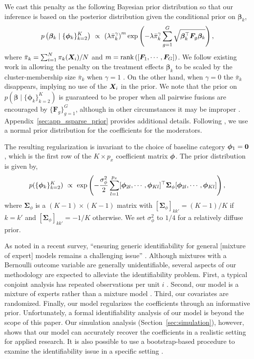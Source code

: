 We cast this penalty as the following Bayesian prior distribution so
that our inference is based on the posterior distribution given the conditional prior on $\bm{\beta}_k$,
\begin{equation}
\label{eq:prior_beta}
p\left(\bbeta_k \mid \{\bm{\phi}_k\}_{k=2}^K\right) \ \propto \ \left(\lambda {\bar{\pi}_k^\gamma}\right)^m \exp\left(-\lambda \bar{\pi}_k^\gamma \sum_{g=1}^{G} \sqrt{\bbeta_k^\top\bF_{g} \bbeta_k}\right), 
\end{equation}
where $\bar{\pi}_k = \sum_{i=1}^N \pi_k(\bm{X}_i)/N$ and
$m = \text{rank}\left([\bm{F}_{1}, \cdots, \bm{F}_{G}]\right)$. We follow
existing work in allowing the penalty on the treatment effects
$\bm{\beta}_k$ to be scaled by the cluster-membership size
$\bar{\pi}_k$ when $\gamma = 1$
\citep{khal:chen:07,stadler2010lasso}.
On the other hand, when $\gamma = 0$ the $\bar{\pi}_k$ disappears, implying no use of the $\bm{X}_i$ in the prior.
 We note that the prior on
$p(\bm{\beta} \mid \{\bm{\phi}_k\}_{k=2}^K)$ is guaranteed to be
proper when all pairwise fusions are encouraged by
$\{\bm{F}_g\}_{g=1}^G$, although in other circumstances it may be
improper
\citep{goplerud2021sparsity}.  Appendix~\ref{sec:app_ssparse_prior}
provides additional details. Following \cite{zahid2013ridge}, we use a
normal prior distribution for the coefficients for the moderators.

The resulting regularization is invariant to the choice of baseline
category $\bm{\phi}_1 = \bm{0}$, which is the first row of the
$K \times p_x$ coefficient matrix $\bm{\phi}$.  The prior distribution is
given by,
\begin{equation}
\label{eq:prior_phi}
p(\{\bm{\phi}_k\}_{k=2}^K) \ \propto \ \exp\left(-\frac{\sigma^2_\phi}{2}\sum_{l=1}^{p_x} [\bphi_{2l}, \cdots, \bphi_{Kl}]^\top \bm{\Sigma}_\phi [\bphi_{2l}, \cdots, \bphi_{Kl}]\right), 
\end{equation}
where $\bm{\Sigma}_\phi$ is a $(K-1) \times (K-1)$ matrix with
$[\bm{\Sigma}_\phi]_{kk'} = (K-1)/K$ if $k = k'$ and $[\bm{\Sigma}_\phi]_{kk'} =-1/K$
otherwise. We set $\sigma^2_\phi$ to $1/4$ for a relatively diffuse prior.

As noted in a recent survey, ``ensuring generic identifiability for general [mixture of expert] models remains a challenging issue'' \cite[p. 294]{gormley2019mixture}.  Although mixtures with a Bernoulli outcome variable are generally unidentifiable, several aspects of our methodology are expected to alleviate the identifiability problem. First, a typical conjoint analysis has repeated observations per unit $i$ \citep{grun2008multinomial}.  Second, our model is a mixture of experts rather than a mixture model \citep{jiang1999identifiability}.
Third, our covariates are randomized. Finally, our model regularizes the coefficients through an informative prior. Unfortunately, a formal identifiability analysis of our model is beyond the scope of this paper.  Our simulation analysis (Section~\ref{sec:simulation}), however, shows that our model can accurately recover the coefficients in a realistic setting for applied research. It is also possible to use a bootstrap-based procedure to examine the
identifiability issue in a specific setting
\citep{grun2008multinomial}.


